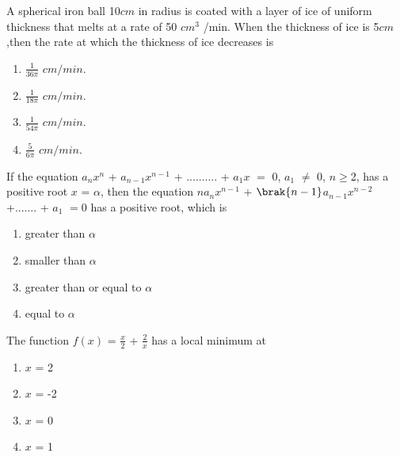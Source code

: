 \iffalse
\title{16. Applications of derivatives}
\author{EE24BTECH11065 - spoorthi }
\section{mains}
\fi

    \item A spherical iron ball 10$cm$ in radius is coated with a layer of ice of uniform thickness that melts at a rate of 50 $cm^3$ /min. When the thickness of ice is 5$cm$,then the rate at which the thickness of ice decreases is\hfill{}
    \begin{multicols}{4}
    \begin{enumerate}
        \item 
        $\frac{1}{36\pi}$ $cm/min$. 
        \item $\frac{1}{18\pi}$ $cm/min$. 
        \item $\frac{1}{54\pi}$ $cm/min$. 
        \item $\frac{5}{6\pi}$  $cm/min$. 
        
    \end{enumerate}
    \end{multicols}

    
    \item If the equation $a_nx^n$ + $a$$_{n-1}x^{n-1}$ + .......... + $a_1$$x$ $=$ 0, $a_1$ $\ne$ 0, $n$$\geq$2, has a positive root $x$ = $\alpha$, then the equation $n$$a_n$$x^{n-1}$  $+$ $\brak{n-1}$$a_{n-1}$$x^{n-2}$ +....... + $a_1$ $=$0 has a positive root, which is 
    \hfill{}
     
    \begin{enumerate}
    
        
    
    
        \item greater than $\alpha$
        \item smaller than $\alpha$
        \item greater than or equal to $\alpha$
        \item equal to $\alpha$
        
        \end{enumerate}
        
            
        \item The function $f(x)$ = $\frac{x}{2}$ + $\frac{2}{x}$ has a local minimum at \hfill{}
         \begin{multicols}{4}
        \begin{enumerate}
        
            
        
         \item $x$ = 2
        \item $x$ = -2
        \item $x$ = 0
        \item $x$ = 1
        
            
        \end{enumerate}
        \end{multicols}
            
